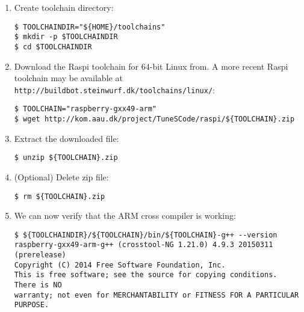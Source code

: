 \begin{enumerate}

\item Create toolchain directory:
\begin{lstlisting}[]
$ TOOLCHAINDIR="${HOME}/toolchains"
$ mkdir -p $TOOLCHAINDIR
$ cd $TOOLCHAINDIR
\end{lstlisting}
\FloatBarrier
\vspace{-5mm}

\item Download the \ac{Raspi} toolchain for 64-bit Linux from.
A more recent \ac{Raspi} toolchain may be available at
\texttt{http://buildbot.steinwurf.dk/toolchains/linux/}:

\begin{lstlisting}[]
$ TOOLCHAIN="raspberry-gxx49-arm"
$ wget http://kom.aau.dk/project/TuneSCode/raspi/${TOOLCHAIN}.zip
\end{lstlisting}
\FloatBarrier
\vspace{-5mm}

\item Extract the downloaded file:
\begin{lstlisting}[]
$ unzip ${TOOLCHAIN}.zip
\end{lstlisting}
\FloatBarrier
\vspace{-5mm}

\item (Optional) Delete zip file:
\begin{lstlisting}[]
$ rm ${TOOLCHAIN}.zip
\end{lstlisting}
\FloatBarrier
\vspace{-5mm}

\item We can now verify that the ARM cross compiler is working:

\begin{lstlisting}[]
$ ${TOOLCHAINDIR}/${TOOLCHAIN}/bin/${TOOLCHAIN}-g++ --version
raspberry-gxx49-arm-g++ (crosstool-NG 1.21.0) 4.9.3 20150311 (prerelease)
Copyright (C) 2014 Free Software Foundation, Inc.
This is free software; see the source for copying conditions.  There is NO
warranty; not even for MERCHANTABILITY or FITNESS FOR A PARTICULAR PURPOSE.
\end{lstlisting}
\FloatBarrier
\vspace{-5mm}


\end{enumerate}
